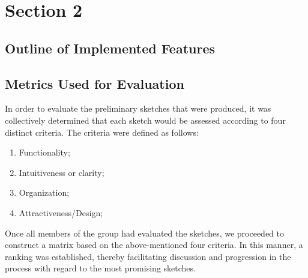 \chapter{Section 2} \label{section2}
\section{Outline of Implemented Features}
\section{Metrics Used for Evaluation}
In order to evaluate the preliminary sketches that were produced, it was collectively determined that each sketch would be assessed according to four distinct criteria.
The criteria were defined as follows:
\begin{enumerate}
    \item Functionality;
    \item Intuitiveness or clarity;
    \item Organization;
    \item Attractiveness/Design;
\end{enumerate}
Once all members of the group had evaluated the sketches, we proceeded to construct a matrix based on the above-mentioned four criteria. In this manner, a ranking was established, thereby facilitating discussion and progression in the process with regard to the most promising sketches.
